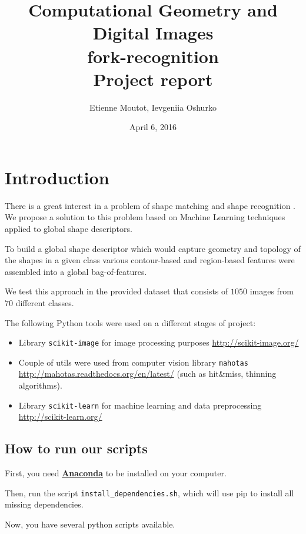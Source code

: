 \documentclass[12pt]{article}
\begin{document}
\title{
Computational Geometry and Digital Images \\
\textbf{fork-recognition}\\
Project report
}

\author{Etienne Moutot, Ievgeniia Oshurko}
\date{April 6, 2016}
\maketitle


\section{Introduction}  

There is a great interest in a problem of shape matching and shape recognition \cite{Zhang20041}. We propose a solution to this problem based on Machine Learning techniques applied to global shape descriptors.

To build a global shape descriptor which would capture geometry and topology of the shapes in a given class various contour-based and region-based features were assembled into a global bag-of-features.

We test this approach in the provided dataset that consists of $1 050$ images from $70$ different classes.

The following Python tools were used on a different stages of project:
\begin{itemize}
\item Library \texttt{scikit-image} for image processing purposes \url{http://scikit-image.org/}
\item Couple of utils were used from computer vision library \texttt{mahotas} \url{http://mahotas.readthedocs.org/en/latest/} (such as hit\&miss, thinning algorithms).
\item Library \texttt{scikit-learn} for machine learning and data preprocessing \url{http://scikit-learn.org/}
\end{itemize}

\subsection{How to run our scripts}
First, you need \href{https://www.continuum.io/downloads}{\textbf{Anaconda}} to be installed on your computer.

Then, run the script \texttt{install\_dependencies.sh}, which will use pip to install all missing dependencies.

Now, you have several python scripts available.
\end{document}
